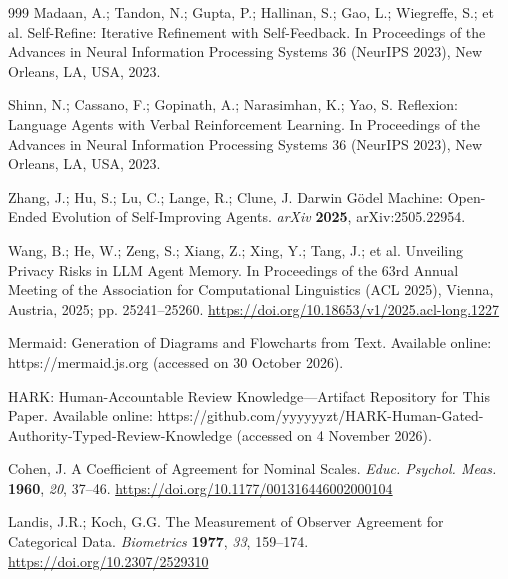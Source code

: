 \documentclass[computers,article,submit,moreauthors]{Definitions/mdpi}
\begin{document}
{\begin{thebibliography}{999}
Madaan, A.; Tandon, N.; Gupta, P.; Hallinan, S.; Gao, L.; Wiegreffe, S.; et al. Self-Refine: Iterative Refinement with Self-Feedback. In Proceedings of the Advances in Neural Information Processing Systems 36 (NeurIPS 2023), New Orleans, LA, USA, 2023.

Shinn, N.; Cassano, F.; Gopinath, A.; Narasimhan, K.; Yao, S. Reflexion: Language Agents with Verbal Reinforcement Learning. In Proceedings of the Advances in Neural Information Processing Systems 36 (NeurIPS 2023), New Orleans, LA, USA, 2023.

Zhang, J.; Hu, S.; Lu, C.; Lange, R.; Clune, J. Darwin G\"odel Machine: Open-Ended Evolution of Self-Improving Agents. \emph{arXiv} {\bf 2025}, arXiv:2505.22954.

Wang, B.; He, W.; Zeng, S.; Xiang, Z.; Xing, Y.; Tang, J.; et al. Unveiling Privacy Risks in LLM Agent Memory. In Proceedings of the 63rd Annual Meeting of the Association for Computational Linguistics (ACL 2025), Vienna, Austria, 2025; pp. 25241--25260. \url{https://doi.org/10.18653/v1/2025.acl-long.1227}

Mermaid: Generation of Diagrams and Flowcharts from Text. Available online: https://mermaid.js.org (accessed on 30 October 2026).

HARK: Human-Accountable Review Knowledge---Artifact Repository for This Paper. Available online: https://github.com/yyyyyyzt/HARK-Human-Gated-Authority-Typed-Review-Knowledge (accessed on 4 November 2026).

Cohen, J. A Coefficient of Agreement for Nominal Scales. {\em Educ. Psychol. Meas.} {\bf 1960}, {\em 20}, 37--46. \url{https://doi.org/10.1177/001316446002000104}

Landis, J.R.; Koch, G.G. The Measurement of Observer Agreement for Categorical Data. {\em Biometrics} {\bf 1977}, {\em 33}, 159--174. \url{https://doi.org/10.2307/2529310}

\end{thebibliography}
}
\end{document}
